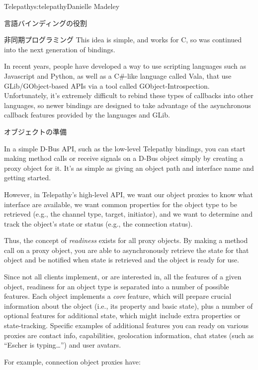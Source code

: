 \begin{aosachapter}{Telepathy}{s:telepathy}{Danielle Madeley}
\begin{aosasect1}{言語バインディングの役割}
\begin{aosasect2}{非同期プログラミング}
\noindent This idea is simple, and works for C, so was continued into
the next generation of bindings.

In recent years, people have developed a way to use scripting
languages such as Javascript and Python, as well as a C\#-like
language called Vala, that use GLib/GObject-based APIs via a tool
called GObject-Introspection.  Unfortunately, it's extremely difficult
to rebind these types of callbacks into other languages, so newer
bindings are designed to take advantage of the asynchronous callback
features provided by the languages and GLib.

\end{aosasect2}

\begin{aosasect2}{オブジェクトの準備}
\label{sec.telepathy.readiness}

In a simple D-Bus API, such as the low-level Telepathy bindings, you
can start making method calls or receive signals on a D-Bus object
simply by creating a proxy object for it.  It's as simple as giving an
object path and interface name and getting started.

However, in Telepathy's high-level API, we want our object proxies to
know what interface are available, we want common properties for the
object type to be retrieved (e.g., the channel type, target,
initiator), and we want to determine and track the object's state or
status (e.g., the connection status).

Thus, the concept of \emph{readiness} exists for all proxy objects. By
making a method call on a proxy object, you are able to asynchronously
retrieve the state for that object and be notified when state is
retrieved and the object is ready for use.

Since not all clients implement, or are interested in, all the
features of a given object, readiness for an object type is separated
into a number of possible features.  Each object implements a
\emph{core} feature, which will prepare crucial information about the
object (i.e., its  property and basic state), plus a
number of optional features for additional state, which might include
extra properties or state-tracking.  Specific examples of additional
features you can ready on various proxies are contact info,
capabilities, geolocation information, chat states (such as ``Escher
is typing{\ldots}'') and user avatars.

For example, connection object proxies have:


\end{aosasect2}
\end{aosasect1}
\end{aosachapter}
